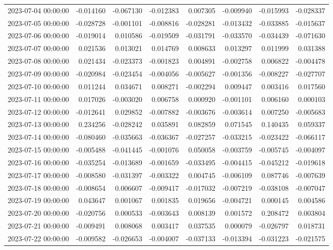 \begin{tabular}{lrrrrrrr}
2023-07-04 00:00:00 & -0.014160 & -0.067130 & -0.012383 & 0.007305 & -0.009940 & -0.015993 & -0.028337 \\
2023-07-05 00:00:00 & -0.028728 & -0.001101 & -0.008816 & -0.028281 & -0.013432 & -0.033885 & -0.015637 \\
2023-07-06 00:00:00 & -0.019014 & 0.010586 & -0.019509 & -0.031791 & -0.033570 & -0.034439 & -0.071630 \\
2023-07-07 00:00:00 & 0.021536 & 0.013021 & 0.014769 & 0.008633 & 0.013297 & 0.011999 & 0.031388 \\
2023-07-08 00:00:00 & 0.021434 & -0.023373 & -0.001823 & 0.004891 & -0.002758 & 0.006822 & -0.004478 \\
2023-07-09 00:00:00 & -0.020984 & -0.023454 & -0.004056 & -0.005627 & -0.001356 & -0.008227 & -0.027707 \\
2023-07-10 00:00:00 & 0.011244 & 0.034671 & 0.008271 & -0.002294 & 0.009447 & 0.003416 & 0.017560 \\
2023-07-11 00:00:00 & 0.017026 & -0.003020 & 0.006758 & 0.000920 & -0.001101 & 0.006160 & 0.000103 \\
2023-07-12 00:00:00 & -0.012641 & 0.029852 & -0.007882 & -0.003676 & -0.003614 & 0.007250 & -0.005683 \\
2023-07-13 00:00:00 & 0.234256 & -0.028242 & 0.035891 & 0.082859 & 0.071545 & 0.140435 & 0.059337 \\
2023-07-14 00:00:00 & -0.080460 & -0.035663 & -0.036367 & -0.027257 & -0.033215 & -0.023422 & -0.066117 \\
2023-07-15 00:00:00 & -0.005488 & -0.041445 & -0.001076 & 0.050058 & -0.003759 & -0.005745 & -0.004097 \\
2023-07-16 00:00:00 & -0.035254 & -0.013689 & -0.001659 & -0.033495 & -0.004415 & -0.045212 & -0.019618 \\
2023-07-17 00:00:00 & -0.008580 & -0.031397 & -0.003322 & 0.004745 & -0.006109 & 0.087746 & -0.007639 \\
2023-07-18 00:00:00 & -0.008654 & 0.006607 & -0.009417 & -0.017032 & -0.007219 & -0.038108 & -0.007047 \\
2023-07-19 00:00:00 & 0.043647 & 0.001067 & 0.001835 & 0.019656 & -0.004721 & 0.000145 & 0.004586 \\
2023-07-20 00:00:00 & -0.020756 & 0.000533 & -0.003643 & 0.008139 & 0.001572 & 0.208472 & 0.003804 \\
2023-07-21 00:00:00 & -0.009491 & 0.008068 & 0.003417 & 0.037535 & 0.000079 & -0.026797 & 0.018731 \\
2023-07-22 00:00:00 & -0.009582 & -0.026653 & -0.004007 & -0.037133 & -0.013394 & -0.031223 & -0.021575 \\

\end{tabular}
